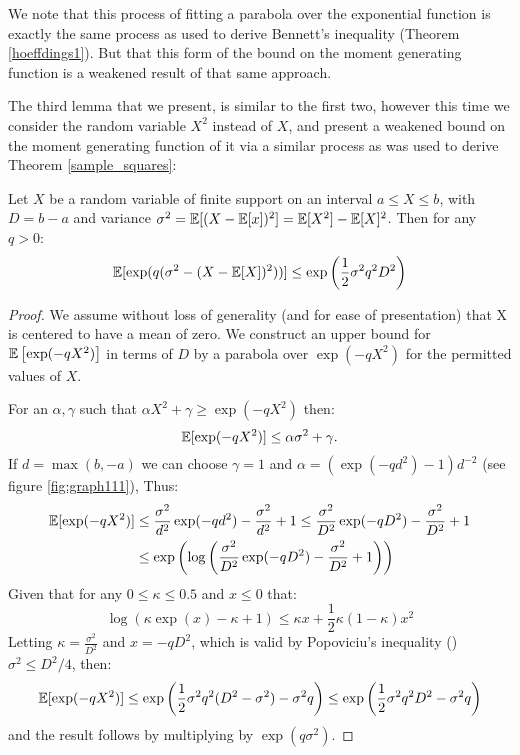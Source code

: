 We note that this process of fitting a parabola over the exponential function is exactly the same process as used to derive Bennett's inequality (Theorem \ref{hoeffdings1}).
But that this form of the bound on the moment generating function is a weakened result of that same approach.

The third lemma that we present, is similar to the first two, however this time we consider the random variable $X^2$ instead of $X$, and present a weakened bound on the moment generating function of it via a similar process as was used to derive Theorem \ref{sample_squares}: 

\begin{lemma}\label{expectation2}
Let $X$ be a random variable of finite support on an interval $a\le X\le b$, with $D=b-a$ and variance $\sigma^2 = \operatorname{\mathbb{E}}[(X-\operatorname{\mathbb{E}}[x])^2] = \operatorname{\mathbb{E}}[X^2]-\operatorname{\mathbb{E}}[X]^2$. Then for any $q>0$:
$$\operatorname{\mathbb{E}}[\exp(q(\sigma^2-(X-\operatorname{\mathbb{E}}[X])^2))] \le \exp\left(\frac{1}{2}\sigma^2q^2D^2\right)$$
\end{lemma}
\begin{proof}
We assume without loss of generality (and for ease of presentation) that X is centered to have a mean of zero.
We construct an upper bound for $\operatorname{\mathbb{E}}\left[\exp(-qX^2)\right]$ in terms of $D$ by a parabola over $\exp(-qX^2)$ for the permitted values of $X$.

For an $\alpha,\gamma$ such that $\alpha X^2+\gamma\ge \exp(-qX^2)$ then:
$$ \operatorname{\mathbb{E}}[\exp(-qX^2)] \le \alpha \sigma^2 + \gamma.$$
If $d=\max(b,-a)$ we can choose $\gamma=1$ and $\alpha=(\exp(-q d^2)-1)d^{-2}$ (see figure \ref{fig:graph111}), Thus:
\begin{align*}
\operatorname{\mathbb{E}}[\exp(-q X^2)] &\le \frac{\sigma^2}{d^2}\exp(-q d^2)-\frac{\sigma^2}{d^2} + 1\le \frac{\sigma^2}{D^2}\exp(-q D^2)-\frac{\sigma^2}{D^2} + 1 \\
&\le \exp\left(\log\left(\frac{\sigma^2}{D^2}\exp(-q D^2)-\frac{\sigma^2}{D^2} + 1\right)\right)
\end{align*}
Given that for any $0\le \kappa \le 0.5$ and $x\le 0$ that: $$\log\left(\kappa\exp(x)-\kappa + 1\right) \le \kappa x+\frac{1}{2}\kappa(1-\kappa)x^2$$
Letting $\kappa=\frac{\sigma^2}{D^2}$ and $x=-qD^2$, which is valid by Popoviciu's inequality (\cite{zbMATH05780164}) $\sigma^2\le D^2/4$, then:
$$ \operatorname{\mathbb{E}}[\exp(-q X^2)] \le \exp\left(\frac{1}{2}\sigma^2q^2(D^2-\sigma^2)-\sigma^2q\right) \le \exp\left(\frac{1}{2}\sigma^2q^2D^2-\sigma^2q\right)$$
and the result follows by multiplying by $\exp(q\sigma^2)$.
\end{proof}

